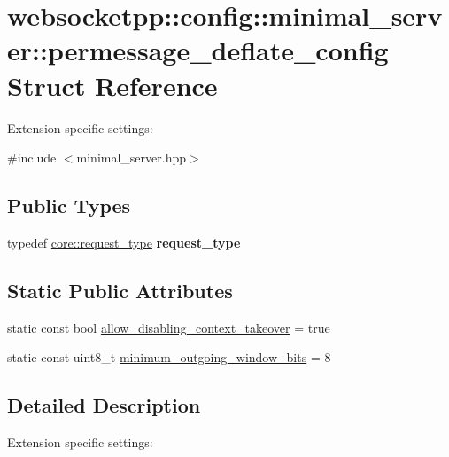 \hypertarget{structwebsocketpp_1_1config_1_1minimal__server_1_1permessage__deflate__config}{}\section{websocketpp\+:\+:config\+:\+:minimal\+\_\+server\+:\+:permessage\+\_\+deflate\+\_\+config Struct Reference}
\label{structwebsocketpp_1_1config_1_1minimal__server_1_1permessage__deflate__config}


Extension specific settings\+:  




{\ttfamily \#include $<$minimal\+\_\+server.\+hpp$>$}

\subsection*{Public Types}
\begin{DoxyCompactItemize}
\item 
\mbox{\label{structwebsocketpp_1_1config_1_1minimal__server_1_1permessage__deflate__config_a3011304a1e8bf6893f946bfd41e967f6}} 
typedef \mbox{\hyperlink{classwebsocketpp_1_1http_1_1parser_1_1request}{core\+::request\+\_\+type}} {\bfseries request\+\_\+type}
\end{DoxyCompactItemize}
\subsection*{Static Public Attributes}
\begin{DoxyCompactItemize}
\item 
static const bool \mbox{\hyperlink{structwebsocketpp_1_1config_1_1minimal__server_1_1permessage__deflate__config_a6e01239ebe19410d4214db6bd1b83d53}{allow\+\_\+disabling\+\_\+context\+\_\+takeover}} = true
\item 
static const uint8\+\_\+t \mbox{\hyperlink{structwebsocketpp_1_1config_1_1minimal__server_1_1permessage__deflate__config_a6faed3e781638f77c451d003578d5ca2}{minimum\+\_\+outgoing\+\_\+window\+\_\+bits}} = 8
\end{DoxyCompactItemize}


\subsection{Detailed Description}
Extension specific settings\+: 

